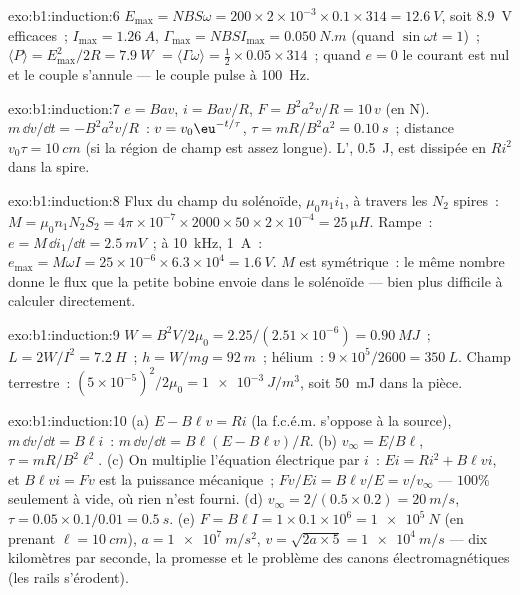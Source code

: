 \begin{solution}{exo:b1:induction:6}
$E_{\max} = NBS\omega = 200 \times 2 \times 10^{-3} \times 0.1 \times 314 = \qty{12.6}{V}$, soit
\qty{8.9}{V} efficaces~; $I_{\max} = \qty{1.26}{A}$, $\Gamma_{\max} = NBSI_{\max} = \qty{0.050}{N.m}$
(quand $\sin\omega t = 1$)~; $\langle P\rangle = E_{\max}^2/2R = \qty{7.9}{W}$ $=
\langle\Gamma\omega\rangle = \tfrac12 \times 0.05 \times 314$~; quand $e = 0$ le courant est
nul et le couple s'annule --- le couple pulse à \qty{100}{Hz}.
\end{solution}

\begin{solution}{exo:b1:induction:7}
$e = Bav$, $i = Bav/R$, $F = B^2a^2v/R = 10\,v$ (en N). $m\,\dd v/\dd t = -B^2a^2v/R$~:
$v = v_0\eu^{-t/\tau}$, $\tau = mR/B^2a^2 = \qty{0.10}{s}$~; distance $v_0\tau =
\qty{10}{cm}$ (si la région de champ est assez longue). L',
\qty{0.5}{J}, est dissipée en $Ri^2$ dans la spire.
\end{solution}

\begin{solution}{exo:b1:induction:8}
Flux du champ du solénoïde, $\mu_0n_1i_1$, à travers les $N_2$ spires~: $M =
\mu_0n_1N_2S_2 = 4\pi \times 10^{-7} \times 2000 \times 50 \times 2 \times 10^{-4} = \qty{25}{\micro H}$.
Rampe~: $e = M\,\dd i_1/\dd t = \qty{2.5}{mV}$~; à \qty{10}{kHz}, \qty{1}{A}~: $e_{\max} =
M\omega I = 25 \times 10^{-6} \times 6.3 \times 10^4 = \qty{1.6}{V}$. $M$ est symétrique~:
le même nombre donne le flux que la petite bobine envoie dans le
solénoïde --- bien plus difficile à calculer directement.
\end{solution}

\begin{solution}{exo:b1:induction:9}
$W = B^2V/2\mu_0 = 2.25/(2.51 \times 10^{-6}) = \qty{0.90}{MJ}$~; $L = 2W/I^2 =
\qty{7.2}{H}$~; $h = W/mg = \qty{92}{m}$~; hélium~: $9 \times 10^5/2600 = \qty{350}{L}$.
Champ terrestre~: $(5 \times 10^{-5})^2/2\mu_0 = \qty{1e-3}{J/m^3}$, soit \qty{50}{mJ} dans
la pièce.
\end{solution}

\begin{solution}{exo:b1:induction:10}
(a) $E - B\ell v = Ri$ (la f.c.é.m. s'oppose à la source), $m\,\dd v/\dd t =
B\ell i$~: $m\,\dd v/\dd t = B\ell(E - B\ell v)/R$. (b) $v_\infty = E/B\ell$, $\tau =
mR/B^2\ell^2$. (c) On multiplie l'équation électrique par $i$~: $Ei = Ri^2 +
B\ell vi$, et $B\ell vi = Fv$ est la puissance mécanique~;  $Fv/Ei =
B\ell v/E = v/v_\infty$ --- $100\%$ seulement à vide, où rien n'est
fourni. (d) $v_\infty = 2/(0.5 \times 0.2) = \qty{20}{m/s}$, $\tau = 0.05 \times
0.1/0.01 = \qty{0.5}{s}$. (e) $F = B\ell I = 1 \times 0.1 \times 10^6 = \qty{1e5}{N}$
(en prenant $\ell = \qty{10}{cm}$), $a = \qty{1e7}{m/s^2}$, $v = \sqrt{2a \times 5} =
\qty{1e4}{m/s}$ --- dix kilomètres par seconde, la promesse et le
problème des canons électromagnétiques (les rails s'érodent).
\end{solution}

